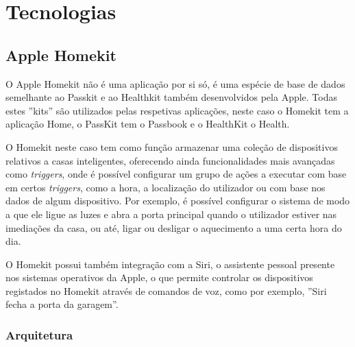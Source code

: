 \section{Tecnologias}

\subsection{Apple Homekit}

O Apple Homekit não é uma aplicação por si só, é uma espécie de base de dados semelhante ao Passkit e ao Healthkit também desenvolvidos pela Apple. Todas estes ''kits'' são utilizados pelas respetivas aplicações, neste caso o Homekit tem a aplicação Home, o PassKit tem o Passbook e o HealthKit o Health. 

O Homekit neste caso tem como função armazenar uma coleção de dispositivos relativos a casas inteligentes, oferecendo ainda funcionalidades mais avançadas como \textit{triggers}, onde é possível configurar um grupo de ações a executar com base em certos \textit{triggers}, como a hora, a localização do utilizador ou com base nos dados de algum dispositivo. Por exemplo, é possível configurar o sistema de modo a que ele ligue as luzes e abra a porta principal quando o utilizador estiver nas imediações da casa, ou até, ligar ou desligar o aquecimento a uma certa hora do dia. 

O Homekit possui também integração com a Siri, o assistente pessoal presente nos sistemas operativos da Apple, o que permite controlar os dispositivos registados no Homekit através de comandos de voz, como por exemplo, ''Siri fecha a porta da garagem''.

\subsubsection{Arquitetura}


